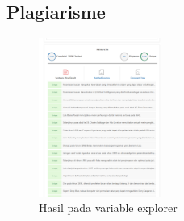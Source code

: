 \subsection{Plagiarisme}
\begin{figure}[H]
	\includegraphics[width=4cm]{figures/1174035/chapter1/plagiarism.png}
	\centering
	\caption{Hasil pada variable explorer}
\end{figure}